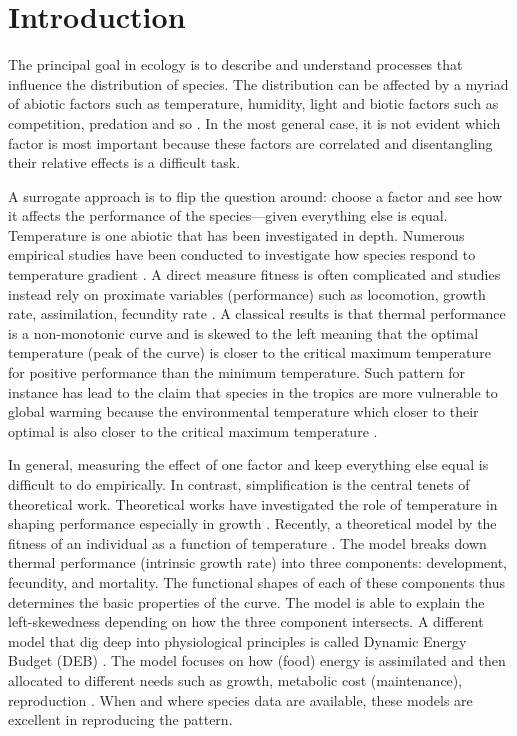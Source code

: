 \section*{Introduction}
The principal goal in ecology is to describe and understand processes that influence the distribution of species.
The distribution can be affected by a myriad of abiotic factors such as temperature, humidity, light  and  biotic factors such as competition, predation and so \citep{Krebs2000}.
In the most general case, it is not evident which factor is most important because these factors are correlated and disentangling their relative effects is a difficult task.

A surrogate approach is to flip the question around: choose a factor and see how it affects the performance of the species---given everything else is equal.
Temperature is one abiotic that has been investigated in depth.
Numerous empirical studies have been conducted to investigate how species respond to temperature gradient \citep[e.g.,][]{Angilletta2009}.
A direct measure fitness is often complicated and studies instead rely on proximate variables (performance) such as locomotion, growth rate, assimilation, fecundity rate \citep[][and reference therein]{Angilletta2009}.
A classical results is that thermal performance is a non-monotonic curve and is skewed to the left meaning that the optimal temperature (peak of the curve) is closer to the critical maximum temperature for positive performance than the minimum temperature. 
Such pattern for instance has lead to the claim that species in the tropics are more vulnerable to global warming because the environmental temperature which closer to their optimal  is also  closer to the critical maximum temperature \citep{Deutsch2008}.

In general, measuring the effect of one factor and keep everything else equal  is difficult to do empirically.
In contrast, simplification is the central tenets of theoretical work.
Theoretical works have investigated the role of temperature in shaping performance especially in growth \citep{VandH1996, Kozlowski2004}.
Recently, a theoretical model by \citet{Amarasekare2012} the fitness of an individual as a function of temperature \citep{Amarasekare2012}.
The model  breaks down thermal performance (intrinsic growth rate)  into three components: development, fecundity, and mortality.
The functional shapes of each of these components thus determines the basic properties of the curve.
The model is able to explain the left-skewedness depending on how the three component intersects.
A different model that dig deep into physiological principles is called Dynamic Energy Budget (DEB) \citep{Kooijman2009}.
The model focuses on how (food) energy is assimilated and then allocated to different needs such as growth, metabolic cost (maintenance), reproduction \citep{Kooijman2009}.
When and where species data are available, these models are excellent in reproducing the pattern. 

